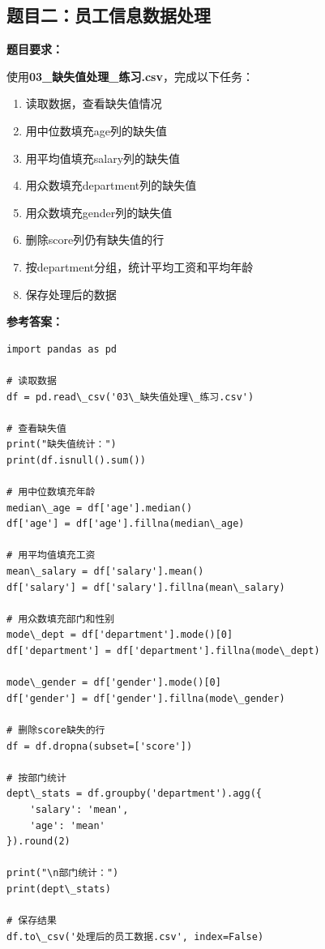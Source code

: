 \documentclass[12pt,a4paper]{article}
\begin{document}
\subsection{题目二：员工信息数据处理}

\begin{practicebox}[竞赛模拟题2]
\textbf{题目要求：}

使用\textbf{03\_缺失值处理\_练习.csv}，完成以下任务：

\begin{enumerate}
    \item 读取数据，查看缺失值情况
    \item 用中位数填充age列的缺失值
    \item 用平均值填充salary列的缺失值
    \item 用众数填充department列的缺失值
    \item 用众数填充gender列的缺失值
    \item 删除score列仍有缺失值的行
    \item 按department分组，统计平均工资和平均年龄
    \item 保存处理后的数据
\end{enumerate}

\textbf{参考答案：}
\begin{lstlisting}
import pandas as pd

# 读取数据
df = pd.read\_csv('03\_缺失值处理\_练习.csv')

# 查看缺失值
print("缺失值统计：")
print(df.isnull().sum())

# 用中位数填充年龄
median\_age = df['age'].median()
df['age'] = df['age'].fillna(median\_age)

# 用平均值填充工资
mean\_salary = df['salary'].mean()
df['salary'] = df['salary'].fillna(mean\_salary)

# 用众数填充部门和性别
mode\_dept = df['department'].mode()[0]
df['department'] = df['department'].fillna(mode\_dept)

mode\_gender = df['gender'].mode()[0]
df['gender'] = df['gender'].fillna(mode\_gender)

# 删除score缺失的行
df = df.dropna(subset=['score'])

# 按部门统计
dept\_stats = df.groupby('department').agg({
    'salary': 'mean',
    'age': 'mean'
}).round(2)

print("\n部门统计：")
print(dept\_stats)

# 保存结果
df.to\_csv('处理后的员工数据.csv', index=False)
\end{lstlisting}
\end{practicebox}
\end{document}

